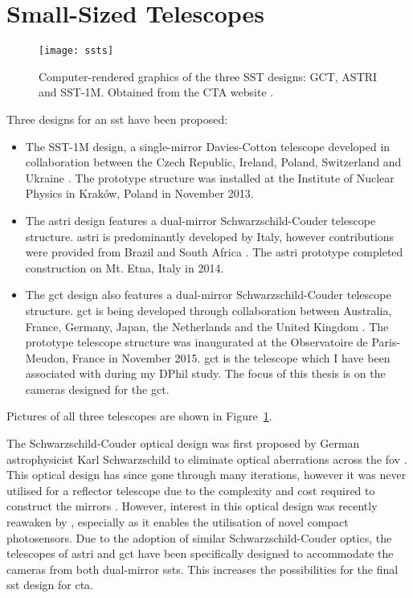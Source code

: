 \section{Small-Sized Telescopes}

\begin{figure}
	\centering\texttt{[image: ssts]} 
	\caption[The three SST designs.]{Computer-rendered graphics of the three SST designs: GCT, ASTRI and SST-1M. Obtained from the CTA website \cite{cta-sst}.}
	\label{fig:ssts}
\end{figure}

Three designs for an \gls{sst} have been proposed:
\begin{itemize}
\item The SST-1M design, a single-mirror Davies-Cotton telescope developed in collaboration between the Czech Republic, Ireland, Poland, Switzerland and Ukraine \cite{cta-sst}. The prototype structure was installed at the Institute of Nuclear Physics in Kraków, Poland in November 2013.
\item The \gls{astri} design features a dual-mirror Schwarzschild-Couder telescope structure. \gls{astri} is predominantly developed by Italy, however contributions were provided from Brazil and South Africa \cite{cta-sst}. The \gls{astri} prototype completed construction on Mt. Etna, Italy in 2014.
\item The \gls{gct} design also features a dual-mirror Schwarzschild-Couder telescope structure. \gls{gct} is being developed through collaboration between Australia, France, Germany, Japan, the Netherlands and the United Kingdom \cite{cta-sst}. The prototype telescope structure was inaugurated at the Observatoire de Paris-Meudon, France in November 2015. \gls{gct} is the telescope which I have been associated with during my DPhil study. The focus of this thesis is on the cameras designed for the \gls{gct}.
\end{itemize}
Pictures of all three telescopes are shown in Figure~\ref{fig:ssts}.

The Schwarzschild-Couder optical design was first proposed by German astrophysicist Karl Schwarzschild to eliminate optical aberrations across the \gls{fov} \cite{Scharzschild1905}. This optical design has since gone through many iterations, however it was never utilised for a reflector telescope due to the complexity and cost required to construct the mirrors \cite{Giro2017}. However, interest in this optical design was recently reawaken by \textcite{Vassiliev2007}, especially as it enables the utilisation of novel compact photosensors. Due to the adoption of similar Schwarzschild-Couder optics, the telescopes of \gls{astri} and \gls{gct} have been specifically designed to accommodate the cameras from both dual-mirror \glspl{sst}. This increases the possibilities for the final \gls{sst} design for \gls{cta}.

